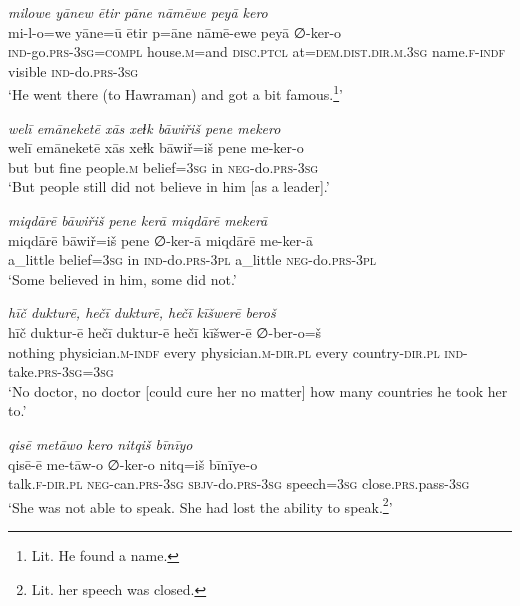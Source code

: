 \ea \label{ŽP.143}
\textit{milowe yānew ētir pāne nāmēwe peyā kero} \\ 
\gll mi-l-o=we yāne=ū ētir p=āne nāmē-ewe peyā ∅-ker-o \\ 
 \textsc{ind-}go\textsc{.prs}\textsc{-3sg}\textsc{=compl} house\textsc{.m}=and \textsc{disc.ptcl} at=\textsc{dem.dist}\textsc{.dir}\textsc{.m}\textsc{.3sg} name\textsc{.f}\textsc{-indf} visible \textsc{ind-}do\textsc{.prs}\textsc{-3sg} \\ 
\glt `He went there (to Hawraman) and got a bit famous.\footnote{Lit. He found a name.}'
\z 
 
\ea \label{ŽP.144}
\textit{welī emāneketē xās xeɫk bāwiřiš pene mekero} \\ 
\gll welī emāneketē xās xeɫk bāwiř=iš pene me-ker-o \\ 
 but but fine people\textsc{.m} belief\textsc{=3sg} in \textsc{neg-}do\textsc{.prs}\textsc{-3sg} \\ 
\glt `But people still did not believe in him [as a leader].'
\z 
 
\ea \label{ŽP.145}
\textit{miqdārē bāwiřiš pene kerā miqdārē mekerā} \\ 
\gll miqdārē bāwiř=iš pene ∅-ker-ā miqdārē me-ker-ā \\ 
 a\_little belief\textsc{=3sg} in \textsc{ind-}do\textsc{.prs}\textsc{-3pl} a\_little \textsc{neg-}do\textsc{.prs}\textsc{-3pl} \\ 
\glt `Some believed in him, some did not.'
\z 
 
\ea \label{ŽP.148}
\textit{hīč dukturē, hečī dukturē, hečī kīšwerē beroš} \\ 
\gll hīč duktur-ē hečī duktur-ē hečī kīšwer-ē ∅-ber-o=š \\ 
 nothing physician\textsc{.m}\textsc{-indf} every physician\textsc{.m}\textsc{-dir}\textsc{.pl} every country\textsc{-dir}\textsc{.pl} \textsc{ind-}take\textsc{.prs}\textsc{-3sg}\textsc{=3sg} \\ 
\glt `No doctor, no doctor [could cure her no matter] how many countries he took her to.'
\z 
 
\ea \label{ŽP.150}
\textit{qisē metāwo kero nitqiš bīnīyo} \\ 
\gll qisē-ē me-tāw-o ∅-ker-o nitq=iš bīnīye-o \\ 
 talk\textsc{.f}\textsc{-dir}\textsc{.pl} \textsc{neg-}can\textsc{.prs}\textsc{-3sg} \textsc{sbjv-}do\textsc{.prs}\textsc{-3sg} speech\textsc{=3sg} close\textsc{.prs}.pass\textsc{-3sg} \\ 
\glt `She was not able to speak. She had lost the ability to speak.\footnote{Lit. her speech was closed.}'
\z 
 
